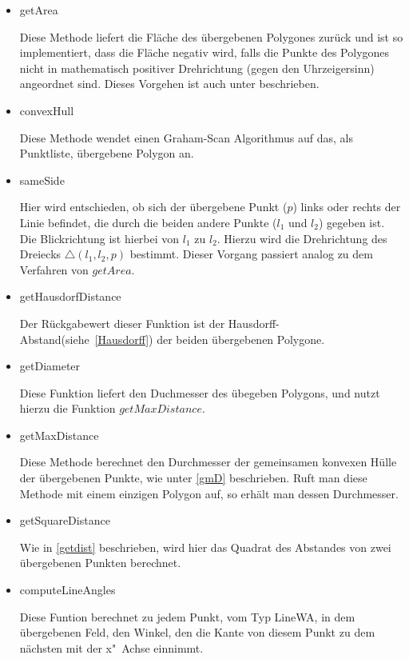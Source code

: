 \begin{itemize}

\item getArea

Diese Methode liefert die Fläche des übergebenen Polygones zurück und ist so implementiert, dass die Fläche negativ wird, falls die Punkte des Polygones nicht in mathematisch positiver Drehrichtung (gegen den Uhrzeigersinn) angeordnet sind. Dieses Vorgehen ist auch unter \cite{BW} beschrieben.

\item convexHull

Diese Methode wendet einen Graham-Scan Algorithmus auf das, als Punktliste, übergebene Polygon an.

\item sameSide

Hier wird entschieden, ob sich der übergebene Punkt ($p$) links oder rechts der Linie befindet, die durch die beiden andere Punkte  ($l_1$ und $l_2$) gegeben ist. Die Blickrichtung ist hierbei von $l_1$ zu $l_2$. Hierzu wird die Drehrichtung des Dreiecks $\bigtriangleup(l_1,l_2,p)$ bestimmt. Dieser Vorgang passiert analog zu  dem Verfahren von $getArea$.

\item getHausdorfDistance

Der Rückgabewert dieser Funktion ist der Hausdorff-Abstand(siehe~\ref{Hausdorff}) der beiden übergebenen Polygone. 

\item getDiameter

Diese Funktion liefert den Duchmesser des übegeben Polygons, und nutzt hierzu die Funktion $getMaxDistance$.

\item getMaxDistance

Diese Methode berechnet den Durchmesser der gemeinsamen konvexen Hülle der übergebenen Punkte, wie unter \ref{gmD} beschrieben. Ruft man diese Methode mit einem einzigen Polygon auf, so erhält man dessen Durchmesser.

\item getSquareDistance

Wie in \ref{getdist} beschrieben, wird hier das Quadrat des Abstandes von zwei übergebenen Punkten berechnet.

\item computeLineAngles

Diese Funtion berechnet zu jedem Punkt, vom Typ LineWA, in dem übergebenen Feld, den Winkel, den die Kante von diesem Punkt zu dem nächsten  mit der x"~Achse einnimmt. 


\end{itemize}
